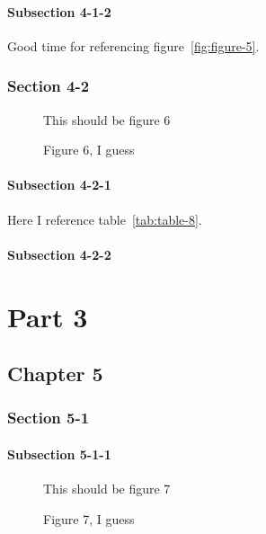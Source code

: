 \documentclass[10pt]{book}
\begin{document}
\subsection{Subsection 4-1-2}
\label{sec:subsection-4-1-2}

Good time for referencing figure~\ref{fig:figure-5}.

\section{Section 4-2}
\label{sec:section-4-2}

\begin{figure}
  \centering
  This should be figure 6
  \caption{Figure 6, I guess}
  \label{fig:figure-6}
\end{figure}



\subsection{Subsection 4-2-1}
\label{sec:subsection-4-2-1}

Here I reference table~\ref{tab:table-8}.

\subsection{Subsection 4-2-2}
\label{sec:subsection-4-2-2}

\appendix

\part{Part 3}
\label{part:part-3}
\parttoc
\partlot
\partlof


\chapter{Chapter 5}
\label{cha:chapter-5}
\minitoc
\minilot
\minilof

\section{Section 5-1}
\label{sec:section-5-1}


\subsection{Subsection 5-1-1}
\label{sec:subsection-5-1-1}

\begin{figure}
  \centering
  This should be figure 7
  \caption{Figure 7, I guess}
  \label{fig:figure-7}
\end{figure}
\end{document}
